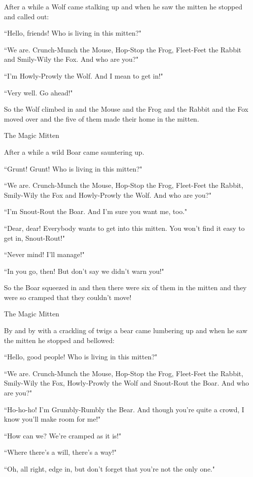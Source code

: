 \documentclass{article}
\begin{document}
After a while a Wolf came stalking up and when he saw the mitten he stopped and called out:

``Hello, friends! Who is living in this mitten?"

``We are. Crunch-Munch the Mouse, Hop-Stop the Frog, Fleet-Feet the Rabbit and Smily-Wily the Fox. And who are you?"

``I'm Howly-Prowly the Wolf. And I mean to get in!"

``Very well. Go ahead!"

So the Wolf climbed in and the Mouse and the Frog and the Rabbit and the Fox moved over and the five of them made their home in the mitten.

The Magic Mitten

After a while a wild Boar came sauntering up.

``Grunt! Grunt! Who is living in this mitten?"

``We are. Crunch-Munch the Mouse, Hop-Stop the Frog, Fleet-Feet the Rabbit, Smily-Wily the Fox and Howly-Prowly the Wolf. And who are you?"

``I'm Snout-Rout the Boar. And I'm sure you want me, too."

``Dear, dear! Everybody wants to get into this mitten. You won't find it easy to get in, Snout-Rout!"

``Never mind! I'll manage!"

``In you go, then! But don't say we didn't warn you!"

So the Boar squeezed in and then there were six of them in the mitten and they were so cramped that they couldn't move!

The Magic Mitten

By and by with a crackling of twigs a bear came lumbering up and when he saw the mitten he stopped and bellowed:

``Hello, good people! Who is living in this mitten?"

``We are. Crunch-Munch the Mouse, Hop-Stop the Frog, Fleet-Feet the Rabbit, Smily-Wily the Fox, Howly-Prowly the Wolf and Snout-Rout the Boar. And who are you?"

``Ho-ho-ho! I'm Grumbly-Rumbly the Bear. And though you're quite a crowd, I know you'll make room for me!"

``How can we? We're cramped as it is!"

``Where there's a will, there's a way!"

``Oh, all right, edge in, but don't forget that you're not the only one."
\end{document}
